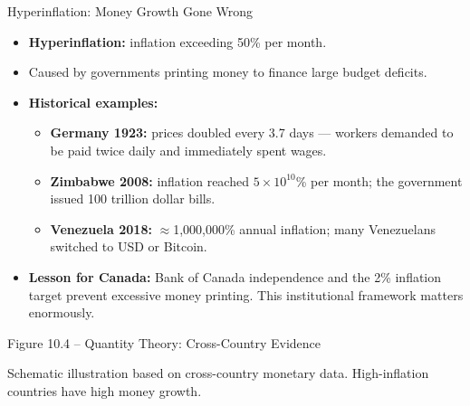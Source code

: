 \documentclass[aspectratio=169]{beamer}
\begin{document}
\begin{frame}{Hyperinflation: Money Growth Gone Wrong}
\transfade
\begin{itemize}[<+->]
  \item \textbf{Hyperinflation:} inflation exceeding \alert{50\% per month}.
  \item Caused by governments printing money to finance large budget deficits.
  \item \textbf{Historical examples:}
  \begin{itemize}[<+->]
    \item \textbf{Germany 1923:} prices doubled every 3.7 days --- workers demanded to be paid twice daily and immediately spent wages.
    \item \textbf{Zimbabwe 2008:} inflation reached $5 \times 10^{10}$\% per month; the government issued 100 trillion dollar bills.
    \item \textbf{Venezuela 2018:} $\approx$1{,}000{,}000\% annual inflation; many Venezuelans switched to USD or Bitcoin.
  \end{itemize}
  \item \textbf{Lesson for Canada:} Bank of Canada independence and the 2\% inflation target prevent excessive money printing. \textcolor{leafgreen}{This institutional framework matters enormously.}
\end{itemize}
\end{frame}

\begin{frame}{Figure 10.4 -- Quantity Theory: Cross-Country Evidence}
\begin{center}
\end{center}
{\tiny Schematic illustration based on cross-country monetary data. High-inflation countries have high money growth.}
\end{frame}
\end{document}

